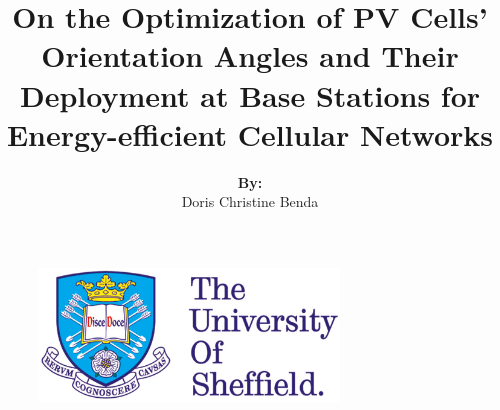 \documentclass[a4paper,12pt,twoside]{report}
\newcommand{\normallinespacing}{\renewcommand{\baselinestretch}{1.5} \normalsize}
\begin{document}
\hypersetup{pageanchor=false}



\begin{figure}
	\centering
		\includegraphics[width=8cm]{pictures/SheffieldLogo.png}
\end{figure}




\title{\vspace{3cm} \LARGE {\bf 
On the Optimization of PV Cells' Orientation Angles and Their Deployment at Base Stations for Energy-efficient Cellular Networks}\\
}

\author{\vspace{2cm} \textbf{By:} \\ \vspace{1cm} Doris Christine Benda \vspace{2cm} }

\normallinespacing
\maketitle

\preface







\body
\printnomenclature
\hypersetup{pageanchor=true}









\clearpage
\normalsize
{}

 
    
\end{document}
